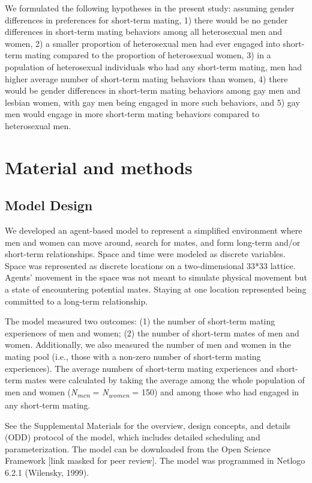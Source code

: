 \documentclass[
  11pt,
]{article}
\begin{document}
We formulated the following hypotheses in the present study: assuming
gender differences in preferences for short-term mating, 1) there would
be no gender differences in short-term mating behaviors among all
heterosexual men and women, 2) a smaller proportion of heterosexual men
had ever engaged into short-term mating compared to the proportion of
heterosexual women, 3) in a population of heterosexual individuals who
had any short-term mating, men had higher average number of short-term
mating behaviors than women, 4) there would be gender differences in
short-term mating behaviors among gay men and lesbian women, with gay
men being engaged in more such behaviors, and 5) gay men would engage in
more short-term mating behaviors compared to heterosexual men.

\hypertarget{material-and-methods}{%
\section{Material and methods}\label{material-and-methods}}

\hypertarget{model-design}{%
\subsection{Model Design}\label{model-design}}

We developed an agent-based model to represent a simplified environment
where men and women can move around, search for mates, and form
long-term and/or short-term relationships. Space and time were modeled
as discrete variables. Space was represented as discrete locations on a
two-dimensional 33*33 lattice. Agents' movement in the space was not
meant to simulate physical movement but a state of encountering
potential mates. Staying at one location represented being committed to
a long-term relationship.

The model measured two outcomes: (1) the number of short-term mating
experiences of men and women; (2) the number of short-term mates of men
and women. Additionally, we also measured the number of men and women in
the mating pool (i.e., those with a non-zero number of short-term mating
experiences). The average numbers of short-term mating experiences and
short-term mates were calculated by taking the average among the whole
population of men and women (\emph{N\textsubscript{men}} =
\emph{N\textsubscript{women}} = 150) and among those who had engaged in
any short-term mating.

See the Supplemental Materials for the overview, design concepts, and
details (ODD) protocol of the model, which includes detailed scheduling
and parameterization. The model can be downloaded from the Open Science
Framework {[}link masked for peer review{]}. The model was programmed in
Netlogo 6.2.1 (Wilensky, 1999).
\end{document}

